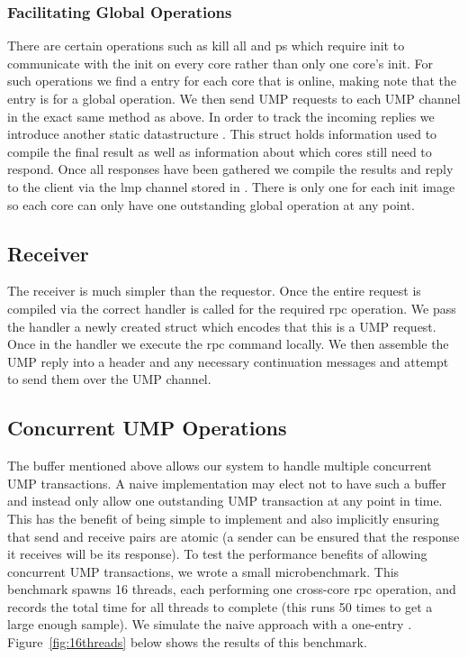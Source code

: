 \subsubsection{Facilitating Global Operations}
There are certain operations such as kill all and ps which require init to communicate with the init on every
core rather than only one core's init. For such operations we find a  entry for each core
that is online, making note that the entry is for a global operation. We then send UMP requests to each UMP channel in the exact same method as above.
In order to track the incoming replies we introduce another static datastructure . This struct 
holds information used to compile the final result as well as information about which cores still need to respond.
Once all responses have been gathered we compile the results and reply to the client via the lmp channel stored in
 . There is only one  for each init image so each core can only have one outstanding
 global operation at any point.

\subsection{Receiver}
\label{sec:receiver}
The receiver is much simpler than the requestor. Once the entire request is compiled via 
the correct handler is called for the required rpc operation. We pass the handler a newly created  struct
which encodes that this is a UMP request. Once in the handler we execute the rpc command locally. We then assemble the 
UMP reply into a header and any necessary continuation messages and attempt to send them over the UMP channel.


\subsection{Concurrent UMP Operations}
The  buffer mentioned above allows our system to handle multiple
concurrent UMP transactions. A naive implementation may elect not to have such a buffer and 
instead only allow one outstanding UMP transaction at any point in time. This has the benefit
of being simple to implement and also implicitly ensuring that send and receive pairs are atomic
 (a sender can be ensured that the response it receives will be its response). To test the performance
 benefits of allowing concurrent UMP transactions, we wrote a small microbenchmark. This benchmark
 spawns 16 threads, each performing one cross-core rpc operation, and records the total time
 for all threads to complete (this runs 50 times to get a large enough sample). We simulate the 
 naive approach with a one-entry . Figure~\ref{fig:16threads} below shows the results of this benchmark.

